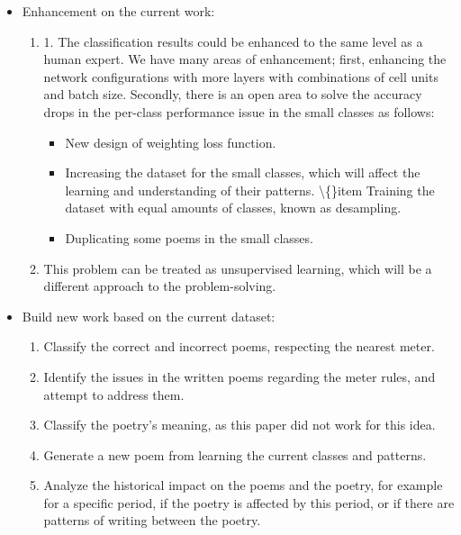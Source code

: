 \begin{itemize}
  \item Enhancement on the current work:
  \begin{enumerate}
    \item 1. The classification results could be enhanced to the same level as a human expert. We have many areas of enhancement; first, enhancing the network configurations with more layers with combinations of cell units and batch size. Secondly, there is an open area to solve the accuracy drops in the per-class performance issue in the small classes as follows:
    	\begin{itemize}
    		\item New design of weighting loss function.
    		\item Increasing the dataset for the small classes, which will affect the learning and understanding of their patterns.
    		\textbackslash\{\}item Training the dataset with equal amounts of classes, known as desampling.
    		\item Duplicating some poems in the small classes.
    	\end{itemize}
    \item This problem can be treated as unsupervised learning, which will be a different approach to the problem-solving.
  \end{enumerate}
  \item Build new work based on the current dataset:
    \begin{enumerate}
    \item Classify the correct and incorrect poems, respecting the nearest meter.
    \item Identify the issues in the written poems regarding the meter rules, and attempt to address them.
    \item Classify the poetry’s meaning, as this paper did not work for this idea.
    \item Generate a new poem from learning the current classes and patterns.
    \item Analyze the historical impact on the poems and the poetry, for example for a specific period, if the poetry is affected by this period, or if there are patterns of writing between the poetry.
  \end{enumerate}
  
\end{itemize}


